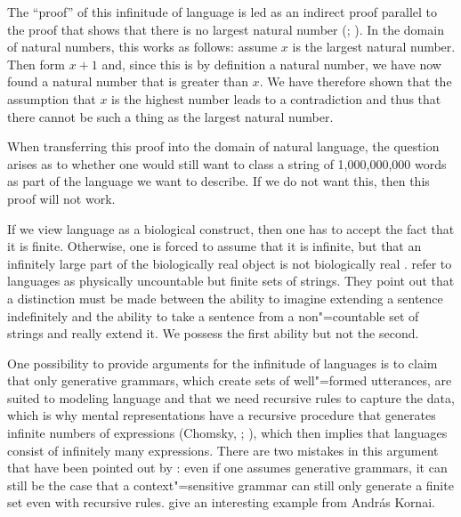 The ``proof'' of this infinitude of language is led as an indirect proof parallel to the proof that shows
that there is no largest natural number (\citealp[--106]{Bierwisch66a}; \citealp[]{Pinker94a}). In the domain of natural numbers, this works
as follows: assume $x$ is the largest natural number. Then form $x + 1$ and, since this is by
definition a natural number, we have now found a natural number that is greater than $x$. We have
therefore shown that the assumption that $x$ is the highest number leads to a contradiction and thus
that there cannot be such a thing as the largest natural number. 

When transferring this proof into the domain of natural language, the question arises as to whether one would still want to class 
a string of 1,000,000,000 words as part of the language we want to describe. If we do not want this, then this proof will not work.

If we view language as a biological construct, then one has to accept the fact that it is finite. Otherwise, one is forced to assume
that it is infinite, but that an infinitely large part of the biologically real object is not biologically real \citep[]{Postal2009a}. \citet{LL2011a} refer to languages as physically uncountable but finite sets of strings.
They point out that a distinction must be made between the ability to imagine extending a sentence indefinitely and the ability
to take a sentence from a non"=countable set of strings and really extend it. We possess the first ability but not the second.

One possibility to provide arguments for the infinitude of languages is to claim that only generative grammars,
which create sets of well"=formed utterances, are suited to modeling language and that we need recursive rules to capture the data, which
is why mental representations have a recursive procedure that generates infinite numbers of expressions (Chomsky, \citeyear[]{Chomsky56a-u}; \citeyear[--87]{Chomsky2002a-u}), which then implies that languages consist of infinitely many expressions.
There are two mistakes in this argument that have been pointed out by \citet{PS2010a}: 
even if one assumes generative grammars, it can still be the case that a context"=sensitive grammar can still only generate a finite set even with 
recursive rules. \citet[120--121]{PS2010a} give an interesting example from Andr{\'a}s Kornai.

